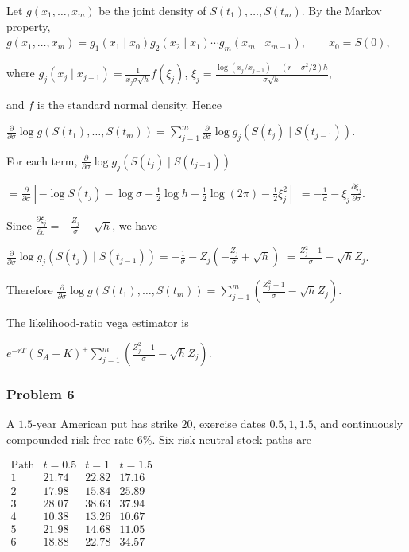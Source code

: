 Let $g(x_1,\ldots,x_m)$ be the joint density of $S(t_1),\ldots,S(t_m)$. By the Markov property,
$g(x_1,\ldots,x_m)=g_1(x_1\mid x_0)g_2(x_2\mid x_1)\cdots g_m(x_m\mid x_{m-1}),\qquad x_0=S(0)$,

where
$g_j(x_j\mid x_{j-1})=\frac1{x_j\sigma\sqrt h}f(\xi_j)$,
$\xi_j=\frac{\log(x_j/x_{j-1})-(r-\sigma^2/2)h}{\sigma\sqrt h}$,

and $f$ is the standard normal density. Hence

$\frac\partial{\partial\sigma}\log g(S(t_1),\ldots,S(t_m))=\sum_{j=1}^m\frac\partial{\partial\sigma}\log g_j(S(t_j)\mid S(t_{j-1}))$.

For each term,
$\frac\partial{\partial\sigma}\log g_j(S(t_j)\mid S(t_{j-1}))$

$=\frac\partial{\partial\sigma}\left[-\log S(t_j)-\log\sigma-\frac12\log h-\frac12\log(2\pi)-\frac12\xi_j^2\right]$
$=-\frac1\sigma-\xi_j\frac{\partial\xi_j}{\partial\sigma}$.

Since
$\frac{\partial\xi_j}{\partial\sigma}=-\frac{Z_j}\sigma+\sqrt h$,
we have

$\frac\partial{\partial\sigma}\log g_j(S(t_j)\mid S(t_{j-1}))=-\frac1\sigma-Z_j\left(-\frac{Z_j}\sigma+\sqrt h\right)$
$=\frac{Z_j^2-1}\sigma-\sqrt hZ_j$.

Therefore
$\frac\partial{\partial\sigma}\log g(S(t_1),\ldots,S(t_m))=\sum_{j=1}^m\left(\frac{Z_j^2-1}\sigma-\sqrt hZ_j\right)$.

The likelihood-ratio vega estimator is

$e^{-rT}(S_A-K)^+\sum_{j=1}^m\left(\frac{Z_j^2-1}\sigma-\sqrt hZ_j\right)$.

\subsubsection*{Problem 6}

 A $1.5$-year American put has strike $20$, exercise dates $0.5,1,1.5$, and continuously compounded risk-free rate $6\%$. Six risk-neutral stock paths are

$\begin{array}{c|ccc}\text{Path}&t=0.5&t=1&t=1.5\\\hline1&21.74&22.82&17.16\\2&17.98&15.84&25.89\\3&28.07&38.63&37.94\\4&10.38&13.26&10.67\\5&21.98&14.68&11.05\\6&18.88&22.78&34.57\end{array}$

